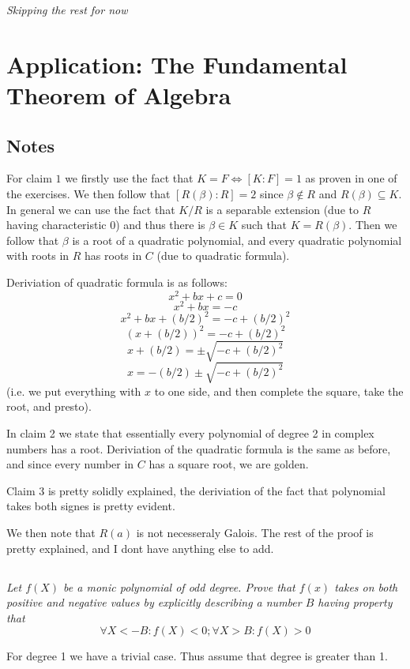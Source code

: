 \documentclass[11pt,oneside,titlepage]{book}
\DeclareMathOperator \lra {\Leftrightarrow}
\begin{document}
\textit{Skipping the rest for now}

\section{Application: The Fundamental Theorem of Algebra}

\subsection*{Notes}

For claim $1$ we firstly use the fact that $K = F \lra [K:F] = 1$ as
proven in one of the exercises. We then follow that $[R(\beta): R] =
2$ since $\beta \notin R$ and $R(\beta) \subseteq K$. In general we
can use the fact that $K/R$ is a separable extension (due to $R$
having characteristic 0) and thus there is $\beta \in K$ such that $K
= R(\beta)$. Then we follow that $\beta$ is a root of a quadratic
polynomial, and every quadratic polynomial with roots in $R$ has
roots in $C$ (due to quadratic formula).

Deriviation of quadratic formula is as follows:
$$x^2 + bx + c = 0$$
$$x^2 + bx = - c$$
$$x^2 + bx + (b/2)^2 = - c + (b/2)^2$$
$$(x + (b/2))^2 = - c + (b/2)^2$$
$$x + (b/2) = \pm \sqrt{- c + (b/2)^2}$$
$$x = - (b/2) \pm \sqrt{- c + (b/2)^2}$$
(i.e. we put everything with $x$ to one side, and then complete the
square, take the root, and presto).

In claim 2 we state that essentially every polynomial of degree 2 in
complex numbers has a root. Deriviation of the quadratic formula is
the same as before, and since every number in $C$ has a square root,
we are golden.

Claim 3 is pretty solidly explained, the deriviation of the fact that
polynomial takes both signes is pretty evident.

We then note that $R(a)$ is not necesseraly Galois. The rest of the proof is
pretty explained, and I dont have anything else to add.

\subsection{}

\textit{Let $f(X)$ be a monic polynomial of odd degree. Prove that $f(x)$ takes
  on both positive and negative values by explicitly describing a number $B$
  having property that
  $$\forall X < -B: f(X) < 0 ; \forall X > B: f(X) > 0$$
}

For degree 1 we have a trivial case. Thus assume that degree is greater
than 1. 
\end{document}
